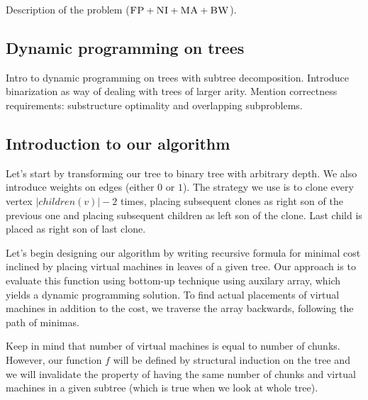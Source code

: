 Description of the problem ($\textsc{FP}+\textsc{NI}+\textsc{MA}+\textsc{BW}$).

\subsection{Dynamic programming on trees}

Intro to dynamic programming on trees with subtree decomposition.
Introduce binarization as way of dealing with trees of larger arity.
Mention correctness requirements: substructure optimality and
overlapping subproblems.

\subsection{Introduction to our algorithm}




Let's start by transforming our tree to binary tree with arbitrary
depth. We also introduce weights on edges (either $0$ or $1$). The
strategy we use is to clone every vertex $|children(v)| - 2$ times,
placing subsequent clones as right son of the previous one and placing
subsequent children as left son of the clone. Last child is placed as
right son of last clone.

Let's begin designing our algorithm by writing recursive formula for
minimal cost inclined by placing virtual machines in leaves of a given
tree. Our approach is to evaluate this function using bottom-up
technique using auxilary array, which yields a dynamic programming
solution. To find actual placements of virtual machines in addition to
the cost, we traverse the array backwards, following the path of
minimas.

Keep in mind that number of virtual machines is equal to number of
chunks. However, our function $f$ will be defined by structural
induction on the tree and we will invalidate the property of having
the same number of chunks and virtual machines in a given subtree
(which is true when we look at whole tree).

